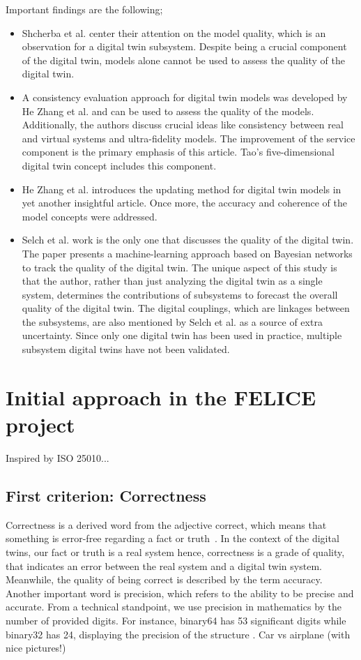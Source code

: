 \documentclass[9pt,conference]{IEEEtran}
\begin{document}
    Important findings are the following;
    \begin{itemize}
        \item Shcherba et al. center their attention on the model quality, which is an observation for a digital twin subsystem. Despite being a crucial component of the digital twin, models alone cannot be used to assess the quality of the digital twin.
        \item A consistency evaluation approach for digital twin models was developed by He Zhang et al. and can be used to assess the quality of the models. Additionally, the authors discuss crucial ideas like consistency between real and virtual systems and ultra-fidelity models. The improvement of the service component is the primary emphasis of this article. Tao's five-dimensional digital twin concept includes this component.
        \item He Zhang et al. introduces the updating method for digital twin models in yet another insightful article. Once more, the accuracy and coherence of the model concepts were addressed.
        \item Selch et al. work is the only one that discusses the quality of the digital twin. The paper presents a machine-learning approach based on Bayesian networks to track the quality of the digital twin. The unique aspect of this study is that the author, rather than just analyzing the digital twin as a single system, determines the contributions of subsystems to forecast the overall quality of the digital twin. The digital couplings, which are linkages between the subsystems, are also mentioned by Selch et al. as a source of extra uncertainty. 
        Since only one digital twin has been used in practice, multiple subsystem digital twins have not been validated.
    \end{itemize}

    \section{Initial approach in the FELICE project}
    Inspired by ISO 25010...

    \subsection{First criterion: Correctness}
    Correctness is a  derived word from the adjective correct, which means that something is error-free regarding a fact or truth~\cite{OxfordDictionary}. 
    In the context of the digital twins, our fact or truth is a real system hence, 
    correctness is a grade of quality, that indicates an error between the real system and a digital twin system.
    Meanwhile, the quality of being correct is described by the term accuracy. Another important word is precision, 
    which refers to the ability to be precise and accurate\cite{OxfordDictionary}. 
    From a technical standpoint, we use precision in mathematics by the number of provided digits. 
    For instance, binary64 has 53 significant digits while binary32 has 24, displaying the precision of the structure \cite{IEE754}.  
    Car vs airplane (with nice pictures!)
\end{document}
